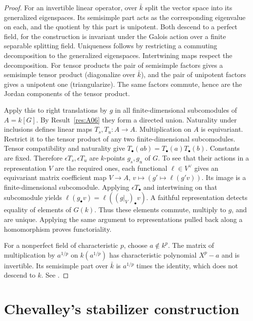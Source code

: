 \documentclass[11pt,a4paper,openany,oneside]{book}
\theoremstyle{resultstyle}
\theoremstyle{definition}
\numberwithin{equation}{chapter}
\begin{document}
\begin{proof}
For an invertible linear operator, over \(\bar k\) split the vector space
into its generalized eigenspaces. Its semisimple part acts as the
corresponding eigenvalue on each, and the quotient by this part
is unipotent. Both descend to a perfect field, for the construction is
invariant under the Galois action over a finite separable splitting
field. Uniqueness follows by restricting a commuting decomposition
to the generalized eigenspaces. Intertwining maps respect the
decomposition. For tensor products the pair of semisimple factors
gives a semisimple tensor product (diagonalize over \(\bar k\)),
and the pair of unipotent factors gives a unipotent one (triangularize).
The same factors commute, hence are the Jordan components of the
tensor product.

Apply this to right translations by \(g\) in all finite-dimensional
subcomodules of \(A=k[G]\). By Result~\ref{res:A06} they form a
directed union. Naturality under inclusions defines linear maps
\(T_s,T_u:A\to A\). Multiplication on \(A\) is equivariant. Restrict it
to the tensor product of any two finite-dimensional subcomodules.
Tensor compatibility and naturality give
\(T_\bullet(ab)=T_\bullet(a)T_\bullet(b)\). Constants are fixed.
Therefore \(\epsilon T_s,\epsilon T_u\) are \(k\)-points \(g_s,g_u\)
of \(G\). To see that their actions in a representation \(V\)
are the required ones, each functional \(\ell\in V^\vee\) gives an
equivariant matrix coefficient map \(V\to A\),
\(v\mapsto(g'\mapsto\ell(g'v))\). Its image is a finite-dimensional
subcomodule. Applying \(\epsilon T_\bullet\) and intertwining on that
subcomodule yields
\(\ell(g_\bullet v)=\ell((g|_V)_\bullet v)\).
A faithful representation detects equality of elements of \(G(k)\).
Thus these elements commute, multiply to \(g\), and are unique.
Applying the same argument to representations pulled back along
a homomorphism proves functoriality.

For a nonperfect field of characteristic \(p\), choose \(a\notin k^p\).
The matrix of multiplication by \(a^{1/p}\) on \(k(a^{1/p})\)
has characteristic polynomial \(X^p-a\) and is invertible. Its
semisimple part over \(\bar k\) is \(a^{1/p}\) times the identity,
which does not descend to \(k\).
See \cite[Theorems 9.2, 9.11, 9.18, Propositions 9.13--9.15 and
Example 9.16]{milne}.
\end{proof}

\section{Chevalley's stabilizer construction}
\end{document}
